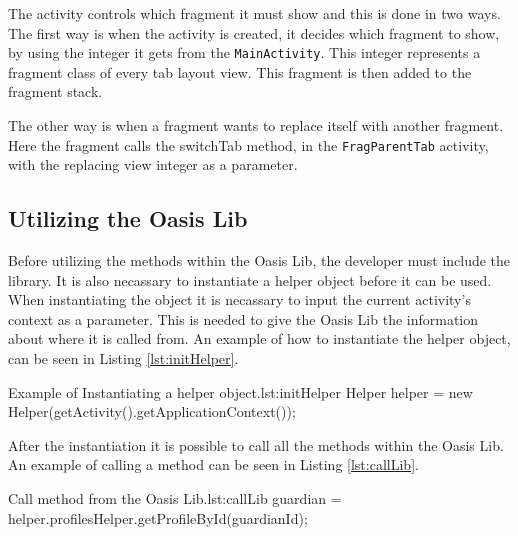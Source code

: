 The activity controls which fragment it must show and this is done in two ways.
The first way is when the activity is created, it decides which fragment to show, by using the integer it gets from the \texttt{MainActivity}.
This integer represents a fragment class of every tab layout view.
This fragment is then added to the fragment stack.

The other way is when a fragment wants to replace itself with another fragment.
Here the fragment calls the switchTab method, in the \texttt{FragParentTab} activity, with the replacing view integer as a parameter.

\subsection{Utilizing the Oasis Lib}
Before utilizing the methods within the Oasis Lib, the developer must include the library.
It is also necassary to instantiate a helper object before it can be used.
When instantiating the object it is necassary to input the current activity's context as a parameter.
This is needed to give the Oasis Lib the information about where it is called from.
An example of how to instantiate the helper object, can be seen in Listing \vref{lst:initHelper}.

\begin{Java}{Example of Instantiating a helper object.}{lst:initHelper}
Helper helper = new Helper(getActivity().getApplicationContext());
\end{Java}

After the instantiation it is possible to call all the methods within the Oasis Lib.
An example of calling a method can be seen in Listing \vref{lst:callLib}.

\begin{Java}{Call method from the Oasis Lib.}{lst:callLib}
guardian = helper.profilesHelper.getProfileById(guardianId);
\end{Java}